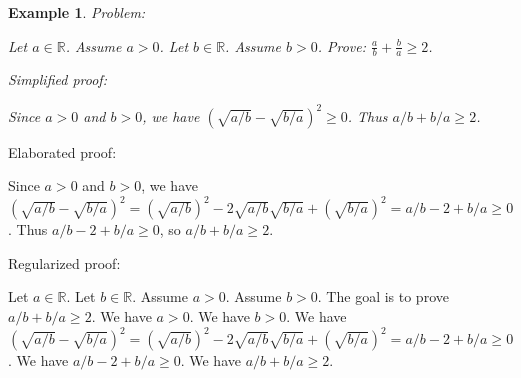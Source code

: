 \documentclass{article}
\newtheorem{example}{Example}
\begin{document}
\begin{example}
Problem:
\begin{tcolorbox}[colback=yellow!10, width=\linewidth]
Let $a\in\mathbb{R}$. Assume $a > 0$.
    Let $b\in\mathbb{R}$. Assume $b > 0$.
    Prove: $\frac{a}{b} + \frac{b}{a} \ge 2$.
\end{tcolorbox}

Simplified proof:
\begin{tcolorbox}[colback=blue!10, width=\linewidth]
Since $a>0$ and $b>0$, we have $(\sqrt{a/b} - \sqrt{b/a})^2 \ge 0$. Thus $a/b + b/a \ge 2$.
\end{tcolorbox}
\end{example}

Elaborated proof:
\begin{tcolorbox}[colback=green!10, width=\linewidth]
Since $a>0$ and $b>0$, we have $(\sqrt{a/b} - \sqrt{b/a})^2 = (\sqrt{a/b})^2 - 2\sqrt{a/b}\sqrt{b/a} + (\sqrt{b/a})^2 = a/b - 2 + b/a \ge 0$. Thus $a/b - 2 + b/a \ge 0$, so $a/b + b/a \ge 2$.
\end{tcolorbox}

Regularized proof:
\begin{tcolorbox}[colback=red!10, width=\linewidth]
Let $a\in\mathbb{R}$.
Let $b\in\mathbb{R}$.
Assume $a>0$.
Assume $b>0$.
The goal is to prove $a/b + b/a \ge 2$.
We have $a>0$.
We have $b>0$.
We have ${{(\sqrt{a/b} - \sqrt{b/a})}}^2 = {{(\sqrt{a/b})}}^2 - 2\sqrt{a/b}\sqrt{b/a} + {{(\sqrt{b/a})}}^2 = a/b - 2 + b/a \ge 0$.
We have $a/b - 2 + b/a \ge 0$.
We have $a/b + b/a \ge 2$.
\end{tcolorbox}
\end{document}
